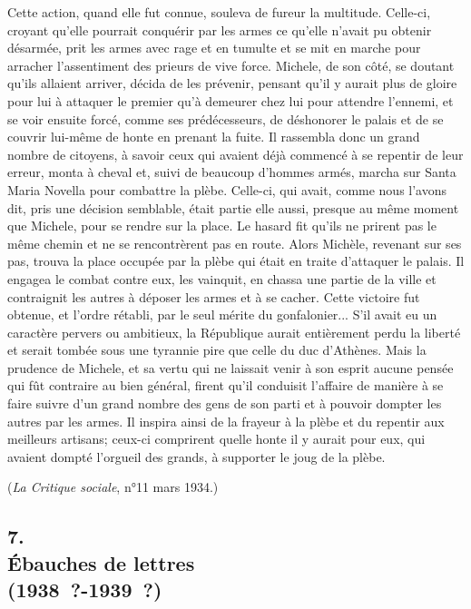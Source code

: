 \documentclass[french,twoside]{book} %
\newenvironment{quoteblock}%
  {\begin{quoting}}
  {\end{quoting}}
\newenvironment{quotebar}{%
    \def\FrameCommand{{\color{rubric!10!}\vrule width 0.5em} \hspace{0.9em}}%
    \def\OuterFrameSep{\itemsep} %
    \MakeFramed {\advance\hsize-\width \FrameRestore}
  }%
  {%
    \endMakeFramed
  }
\renewenvironment{quoteblock}%
  {%
    \savenotes
    \setstretch{0.9}
    \normalfont
    \begin{quotebar}
  }
  {%
    \end{quotebar}
    \spewnotes
  }
\begin{document}
\begin{quoteblock}
 Cette action, quand elle fut connue, souleva de fureur la multitude. Celle-ci, croyant qu'elle pourrait conquérir par les armes ce qu'elle n'avait pu obtenir désarmée, prit les armes avec rage et en tumulte et se mit en marche pour arracher l'assentiment des prieurs de vive force. Michele, de son côté, se dou­tant qu'ils allaient arriver, décida de les prévenir, pensant qu'il y aurait plus de gloire pour lui à attaquer le premier qu'à demeurer chez lui pour attendre l'ennemi, et se voir ensuite forcé, comme ses prédécesseurs, de déshonorer le palais et de se couvrir lui-même de honte en prenant la fuite. Il rassembla donc un grand nombre de citoyens, à savoir ceux qui avaient déjà commencé à se repentir de leur erreur, monta à cheval et, suivi de beaucoup d'hommes armés, marcha sur Santa Maria Novella pour combattre la plèbe. Celle-ci, qui avait, comme nous l'avons dit, pris une décision semblable, était partie elle aussi, presque au même moment que Michele, pour se rendre sur la place. Le hasard fit qu'ils ne prirent pas le même chemin et ne se rencontrèrent pas en route. Alors Michèle, revenant sur ses pas, trouva la place occupée par la plèbe qui était en traite d'attaquer le palais. Il engagea le combat contre eux, les vainquit, en chassa une partie de la ville et contraignit les autres à déposer les armes et à se cacher. Cette victoire fut obtenue, et l'ordre rétabli, par le seul mérite du gonfalonier... S'il avait eu un caractère pervers ou ambitieux, la République aurait entièrement perdu la liberté et serait tombée sous une tyrannie pire que celle du duc d'Athènes. Mais la prudence de Michele, et sa vertu qui ne laissait venir à son esprit aucune pensée qui fût contraire au bien général, firent qu'il conduisit l'affaire de manière à se faire suivre d'un grand nombre des gens de son parti et à pouvoir dompter les autres par les armes. Il inspira ainsi de la frayeur à la plèbe et du repentir aux meilleurs artisans; ceux-ci comprirent quelle honte il y aurait pour eux, qui avaient dompté l'orgueil des grands, à supporter le joug de la plèbe.
 \end{quoteblock}

\noindent ({\itshape La Critique sociale}, n°11 mars 1934.)
\subsection[7. Ébauches de lettres  (1938 ?-1939 ?)]{7. \\
Ébauches de lettres \protect\footnotemark  \\
(1938 ?-1939 ?)}
\noindent \par
\end{document}

